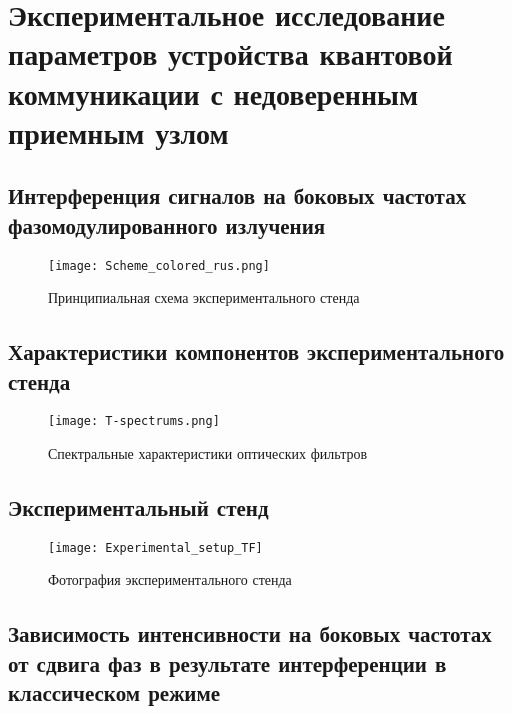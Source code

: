 \chapter{Экспериментальное исследование параметров устройства квантовой коммуникации с недоверенным приемным узлом} \label{ch:ch5}
\section{Интерференция сигналов на боковых частотах фазомодулированного излучения} \label{sec:ch5/sec1}


 \begin{figure}[ht]
  \centering
  \texttt{[image: Scheme\_colored\_rus.png]}
  \caption{Принципиальная схема экспериментального стенда}
  \label{fig:RF_sin}
\end{figure}

\pagebreak

\section{Характеристики компонентов экспериментального стенда} \label{ch:ch5/sect2}

 \begin{figure}[ht]
  \centering
  \texttt{[image: T-spectrums.png]}
  \caption{Спектральные характеристики оптических фильтров}
  \label{fig:Spectrums}
\end{figure}

\pagebreak

\section{Экспериментальный стенд} \label{ch:ch5/sect3}

 \begin{figure}[ht]
  \centering
	 \texttt{[image: Experimental\_setup\_TF]}
  \caption{Фотография экспериментального стенда}
  \label{fig:experimental_setup_TF}
\end{figure}

\pagebreak

\section{Зависимость интенсивности на боковых частотах от сдвига фаз в результате интерференции в классическом режиме} \label{ch:ch5/sect4}


